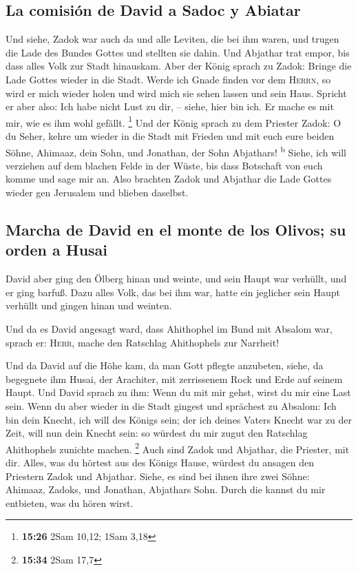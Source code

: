 \hypertarget{la-comisiuxf3n-de-david-a-sadoc-y-abiatar}{%
\subsection{La comisión de David a Sadoc y
Abiatar}\label{la-comisiuxf3n-de-david-a-sadoc-y-abiatar}}

 Und siehe, Zadok war auch da und alle Leviten, die bei
ihm waren, und trugen die Lade des Bundes Gottes und stellten sie dahin.
Und Abjathar trat empor, bis dass alles Volk zur Stadt hinauskam.
 Aber der König sprach zu Zadok: Bringe die Lade Gottes
wieder in die Stadt. Werde ich Gnade finden vor dem \textsc{Herrn}, so
wird er mich wieder holen und wird mich sie sehen lassen und sein Haus.
 Spricht er aber also: Ich habe nicht Lust zu dir, --
siehe, hier bin ich. Er mache es mit mir, wie es ihm wohl gefällt.
\footnote{\textbf{15:26} 2Sam 10,12; 1Sam 3,18}  Und der
König sprach zu dem Priester Zadok: O du Seher, kehre um wieder in die
Stadt mit Frieden und mit euch eure beiden Söhne, Ahimaaz, dein Sohn,
und Jonathan, der Sohn Abjathars! \textsuperscript{b} 
Siehe, ich will verziehen auf dem blachen Felde in der Wüste, bis dass
Botschaft von euch komme und sage mir an.  Also brachten
Zadok und Abjathar die Lade Gottes wieder gen Jerusalem und blieben
daselbst.

\hypertarget{marcha-de-david-en-el-monte-de-los-olivos-su-orden-a-husai}{%
\subsection{Marcha de David en el monte de los Olivos; su orden a
Husai}\label{marcha-de-david-en-el-monte-de-los-olivos-su-orden-a-husai}}

 David aber ging den Ölberg hinan und weinte, und sein
Haupt war verhüllt, und er ging barfuß. Dazu alles Volk, das bei ihm
war, hatte ein jeglicher sein Haupt verhüllt und gingen hinan und
weinten.

 Und da es David angesagt ward, dass Ahithophel im Bund
mit Absalom war, sprach er: \textsc{Herr}, mache den Ratschlag
Ahithophels zur Narrheit!

 Und da David auf die Höhe kam, da man Gott pflegte
anzubeten, siehe, da begegnete ihm Husai, der Arachiter, mit zerrissenem
Rock und Erde auf seinem Haupt.  Und David sprach zu ihm:
Wenn du mit mir gehst, wirst du mir eine Last sein.  Wenn
du aber wieder in die Stadt gingest und sprächest zu Absalom: Ich bin
dein Knecht, ich will des Königs sein; der ich deines Vaters Knecht war
zu der Zeit, will nun dein Knecht sein: so würdest du mir zugut den
Ratschlag Ahithophels zunichte machen. \footnote{\textbf{15:34} 2Sam
  17,7}  Auch sind Zadok und Abjathar, die Priester, mit
dir. Alles, was du hörtest aus des Königs Hause, würdest du ansagen den
Priestern Zadok und Abjathar.  Siehe, es sind bei ihnen
ihre zwei Söhne: Ahimaaz, Zadoks, und Jonathan, Abjathars Sohn. Durch
die kannst du mir entbieten, was du hören wirst.


